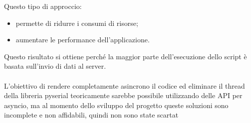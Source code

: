 Questo tipo di approccio:
\begin{itemize}
	\item permette di ridurre i consumi di risorse;
	\item aumentare le performance dell'applicazione.
\end{itemize}
Questo risultato si ottiene perché la maggior parte dell'esecuzione dello script è basata sull'invio di dati al server.\\\\
L'obiettivo di rendere completamente asincrono il codice ed eliminare il thread della libreria pyserial teoricamente sarebbe possibile utilizzando delle API per asyncio, ma al momento dello sviluppo del progetto queste soluzioni sono incomplete e non affidabili, quindi non sono state scartat
